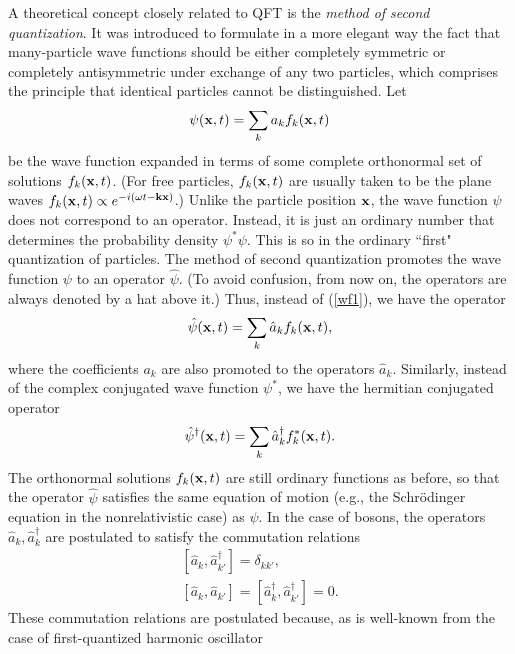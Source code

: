 \documentclass[12pt]{article}
\begin{document}
A theoretical concept closely related to QFT is the 
{\em method of second quantization}. It was introduced 
to formulate in a more elegant way the fact that 
many-particle wave functions should be either completely symmetric
or completely antisymmetric under exchange of any two particles, 
which comprises the principle that identical particles 
cannot be distinguished. Let
\begin{equation}\label{wf1}
\psi({\bf x},t)=\sum_k a_k f_k({\bf x},t)
\end{equation}
be the wave function expanded in terms of some 
complete orthonormal set of solutions $f_k({\bf x},t)$. 
(For free particles, $f_k({\bf x},t)$ are usually taken to 
be the plane waves $f_k({\bf x},t) \propto e^{-i(\omega t - {\bf kx})}$.)
Unlike the particle position ${\bf x}$, the wave function $\psi$
does not correspond to an operator. Instead, it is just 
an ordinary number that determines the probability density
$\psi^*\psi$. This is so in the ordinary ``first" quantization 
of particles. The method of second quantization promotes 
the wave function $\psi$ to an operator $\hat{\psi}$. 
(To avoid confusion, from now on, 
the operators are always denoted by a hat above it.)
Thus, instead of (\ref{wf1}), we have the operator
\begin{equation}\label{wf2}
\hat{\psi}({\bf x},t)=\sum_k \hat{a}_k f_k({\bf x},t) ,
\end{equation}   
where the coefficients $a_k$ are also promoted to the 
operators $\hat{a}_k$. Similarly, instead of the complex conjugated 
wave function $\psi^*$, we have the hermitian conjugated 
operator
\begin{equation}\label{wf2*}              
\hat{\psi}^{\dagger}({\bf x},t)=\sum_k \hat{a}^{\dagger}_k f_k^*({\bf x},t) .
\end{equation}
The orthonormal solutions $f_k({\bf x},t)$ are still ordinary functions 
as before, so that the operator $\hat{\psi}$ satisfies the same equation of 
motion (e.g., the Schr\"odinger equation in the nonrelativistic case)
as $\psi$. In the case of bosons, 
the operators $\hat{a}_k,\hat{a}_k^{\dagger}$ are postulated to satisfy the 
commutation relations
\begin{eqnarray}\label{combos}
& [\hat{a}_k,\hat{a}_{k'}^{\dagger}]=\delta_{kk'} , & \nonumber \\
& [\hat{a}_k,\hat{a}_{k'}]=
[\hat{a}_k^{\dagger},\hat{a}_{k'}^{\dagger}]=0 .
\end{eqnarray}
These commutation relations are postulated because,
as is well-known from the case of first-quantized harmonic oscillator
\end{document}

